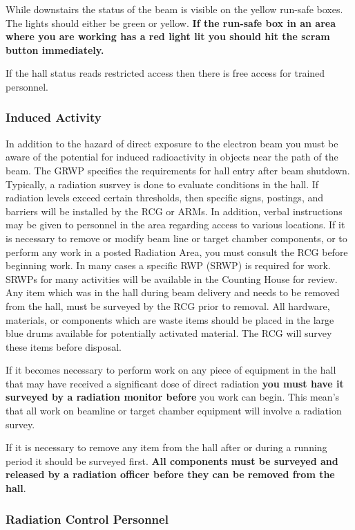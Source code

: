 While downstairs the status of the beam is visible on the yellow
run-safe boxes. The lights should either be green or yellow.
{\bf If the run-safe box in an area where you are working has a red
light lit you should hit the scram button immediately.}

If the hall status reads restricted access then there is free
access for trained personnel.

\subsubsection{Induced Activity}

In addition to the hazard of direct exposure to the electron beam you must
be aware of the potential for induced radioactivity in objects near the path
of the beam.  The GRWP specifies the requirements for hall entry after beam shutdown.  
Typically, a radiation susrvey is done to evaluate conditions in the hall.  If radiation levels 
exceed certain thresholds, then specific signs, postings, and barriers will be installed by the 
RCG or ARMs.  In addition, verbal instructions may be given to personnel in the area 
regarding access to various locations.  If it is necessary to remove or modify beam line or 
target chamber components, or to perform any work in a posted Radiation Area, you must 
consult the RCG before beginning work.  In many cases a specific RWP (SRWP) is 
required for work.  SRWPs for many activities will be available in the Counting House for 
review.  Any item which was in the hall during beam delivery and needs to be removed 
from the hall, must be surveyed by the RCG prior to removal.  All hardware, materials, or 
components which are waste items should be placed in the large blue drums available for 
potentially activated material.  The RCG will survey these items before disposal. 

If it becomes necessary to perform work on any piece of equipment in the hall
that may have received a significant dose of direct radiation {\bf you
must have it surveyed by a radiation monitor before} you work can begin.
This mean's that all work on beamline or target chamber equipment will
involve a radiation survey.

If it is necessary to remove any item from the hall after or during a running
period it should be surveyed first. {\bf All components must be surveyed
and released by a radiation officer before they can be removed from the hall}.

\subsubsection{Radiation Control Personnel}

